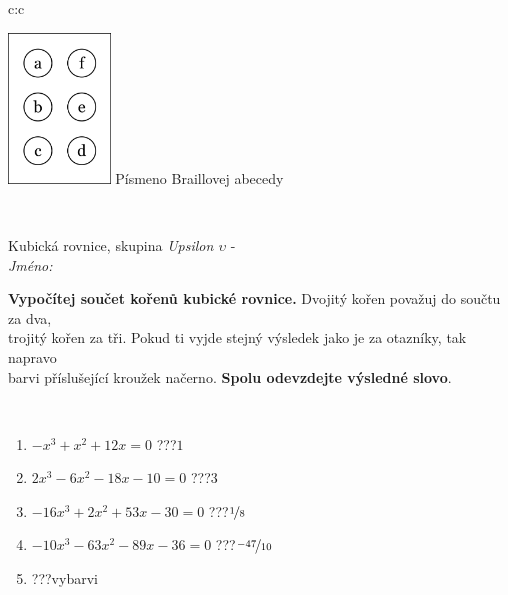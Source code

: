 \documentclass[10pt]{report}
\begin{document}
\begin{tabular}{c:c}
\begin{minipage}[c][104.5mm][t]{0.5\linewidth}
\begin{center}
\begin{minipage}{0.20\linewidth}
\begin{center}
\includegraphics[height=40mm]{../images/braille.png}
{\small Písmeno Braillovej abecedy}
\end{center}
\end{minipage}
\end{center}
\end{minipage}
\\ \hdashline
\begin{minipage}[c][104.5mm][t]{0.5\linewidth}
\begin{center}
\vspace{7mm}
{\huge Kubická rovnice, skupina \textit{Upsilon $\upsilon$} -}\\[5mm]
\textit{Jméno:}\phantom{xxxxxxxxxxxxxxxxxxxxxxxxxxxxxxxxxxxxxxxxxxxxxxxxxxxxxxxxxxxxxxxxx}\\[5mm]
\begin{minipage}{0.95\linewidth}
\begin{center}
\textbf{Vypočítej součet kořenů kubické rovnice.} Dvojitý kořen považuj do součtu za dva,\\trojitý kořen za tři. Pokud ti vyjde stejný výsledek jako je za otazníky, tak napravo\\barvi příslušející kroužek načerno. \textbf{Spolu odevzdejte výsledné slovo}.
\end{center}
\end{minipage}
\\[1mm]
\begin{minipage}{0.79\linewidth}
\begin{center}
\begin{varwidth}{\linewidth}
\begin{enumerate}
\Large
\item $-x^3+x^2+12x=0$\quad \dotfill\; ???\;\dotfill \quad $1$
\item $2x^3-6x^2-18x-10=0$\quad \dotfill\; ???\;\dotfill \quad $3$
\item $-16x^3+2x^2+53x-30=0$\quad \dotfill\; ???\;\dotfill \quad $\nicefrac{1}{8}$
\item $-10x^3-63x^2-89x-36=0$\quad \dotfill\; ???\;\dotfill \quad $\nicefrac{-47}{10}$
\item \quad \dotfill\; ???\;\dotfill \quad vybarvi

\end{enumerate}
\end{varwidth}
\end{center}
\end{minipage}
\end{center}
\end{minipage}
\end{tabular}
\end{document}
